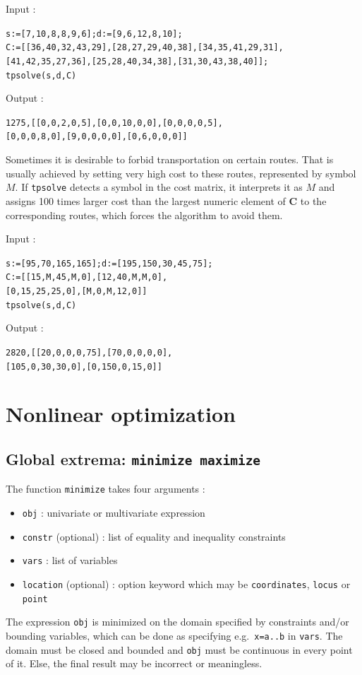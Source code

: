 \documentclass[a4paper,11pt]{book}
\begin{document}
\noindent Input :
\begin{center}
{\tt s:=[7,10,8,8,9,6];d:=[9,6,12,8,10];}\\
{\tt C:=[[36,40,32,43,29],[28,27,29,40,38],[34,35,41,29,31],}\\
{\tt [41,42,35,27,36],[25,28,40,34,38],[31,30,43,38,40]];}\\
{\tt tpsolve(s,d,C)}
\end{center}
Output :
\begin{center}
{\tt 1275,[[0,0,2,0,5],[0,0,10,0,0],[0,0,0,0,5],}\\
{\tt [0,0,0,8,0],[9,0,0,0,0],[0,6,0,0,0]]}
\end{center}

Sometimes it is desirable to forbid transportation on certain routes. That is usually achieved by setting very high cost to these routes, represented by symbol $ M $. If {\tt tpsolve} detects a symbol in the cost matrix, it interprets it as $ M $ and assigns 100 times larger cost than the largest numeric element of $ \mathbf{C} $ to the corresponding routes, which forces the algorithm to avoid them.

\noindent Input :
\begin{center}
{\tt s:=[95,70,165,165];d:=[195,150,30,45,75];}\\
{\tt C:=[[15,M,45,M,0],[12,40,M,M,0],}\\
{\tt [0,15,25,25,0],[M,0,M,12,0]]}\\
{\tt tpsolve(s,d,C)}
\end{center}
Output :
\begin{center}
{\tt 2820,[[20,0,0,0,75],[70,0,0,0,0],}\\
{\tt [105,0,30,30,0],[0,150,0,15,0]]}
\end{center}

\section{Nonlinear optimization}

\subsection{Global extrema: {\tt minimize maximize}}

The function {\tt minimize} takes four arguments :
\begin{itemize}
\item {\tt obj} : univariate or multivariate expression
\item {\tt constr} (optional) : list of equality and inequality constraints
\item {\tt vars} : list of variables
\item {\tt location} (optional) : option keyword which may be {\tt coordinates}, {\tt locus} or {\tt point}
\end{itemize}
The expression {\tt obj} is minimized on the domain specified by constraints and/or bounding variables, which can be done as specifying e.g.~{\tt x=a..b} in {\tt vars}. The domain must be closed and bounded and {\tt obj} must be continuous in every point of it. Else, the final result may be incorrect or meaningless.
\end{document}

